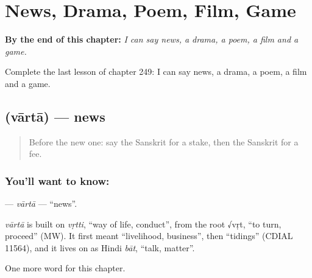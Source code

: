 
\chapter{News, Drama, Poem, Film, Game}
\label{ch:sa-news-drama-poem-film-game}

\begin{chapteropening}
\textbf{By the end of this chapter:} \emph{I can say news, a drama, a poem, a film and a game.}

Complete the last lesson of chapter 249: I can say news, a drama, a poem, a film and a game.
\end{chapteropening}

\section[\texorpdfstring{\sk{वार्ता} (vārtā)}{वार्ता (vārtā)}]{ (vārtā) — news}

\label{lesson:SA-C249-varta}



\begin{quote}
Before the new one: say the Sanskrit for a stake, then the Sanskrit for a fee.
\end{quote}

\subsection*{You'll want to know: }
\textbf{} — \emph{vārtā} — \textquotedblleft{}news\textquotedblright{}.

\begin{cousinweb}
\emph{vārtā} is built on \emph{vṛtti}, \textquotedblleft{}way of life, conduct\textquotedblright{}, from the root √vṛt, \textquotedblleft{}to turn, proceed\textquotedblright{} (MW). It first meant \textquotedblleft{}livelihood, business\textquotedblright{}, then \textquotedblleft{}tidings\textquotedblright{} (CDIAL 11564), and it lives on as Hindi \emph{bāt}, \textquotedblleft{}talk, matter\textquotedblright{}.
\end{cousinweb}

\begin{grammarlens}[title={What you've built}]
One more word for this chapter.
\end{grammarlens}


